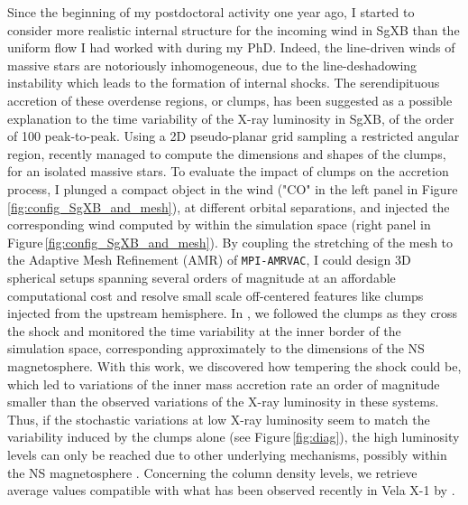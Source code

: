 \documentclass[a4paper,12pt,onecolumn]{article}
\makeatletter
\newcommand{\sgx}{SgXB\xspace}
\newcommand*{\ns}{NS\@\xspace}
\newcommand*{\eg}{e.g.\@\xspace}
\makeatother
\begin{document}
\indent Since the beginning of my postdoctoral activity one year ago, I started to consider more realistic internal structure for the incoming wind in \sgx than the uniform flow I had worked with during my PhD. Indeed, the line-driven winds of massive stars are notoriously inhomogeneous, due to the line-deshadowing instability \citep{Owocki1984a} which leads to the formation of internal shocks. The serendipituous accretion of these overdense regions, or clumps, has been suggested as a possible explanation to the time variability of the X-ray luminosity in \sgx, of the order of 100 peak-to-peak. Using a 2D pseudo-planar grid sampling a restricted angular region, \cite{Sundqvist2017} recently managed to compute the dimensions and shapes of the clumps, for an isolated massive stars. To evaluate the impact of clumps on the accretion process, I plunged a compact object in the wind ("CO" in the left panel in Figure\,\ref{fig:config_SgXB_and_mesh}), at different orbital separations, and injected the corresponding wind computed by \cite{Sundqvist2017} within the simulation space (right panel in Figure\,\ref{fig:config_SgXB_and_mesh}). By coupling the stretching of the mesh to the Adaptive Mesh Refinement (AMR) of \texttt{MPI-AMRVAC}, I could design 3D spherical setups spanning several orders of magnitude at an affordable computational cost and resolve small scale off-centered features like clumps injected from the upstream hemisphere. In \cite{ElMellah}, we followed the clumps as they cross the shock and monitored the time variability at the inner border of the simulation space, corresponding approximately to the dimensions of the \ns magnetosphere. With this work, we discovered how tempering the shock could be, which led to variations of the inner mass accretion rate an order of magnitude smaller than the observed variations of the X-ray luminosity in these systems. Thus, if the stochastic variations at low X-ray luminosity seem to match the variability induced by the clumps alone (see Figure\,\ref{fig:diag}), the high luminosity levels can only be reached due to other underlying mechanisms, possibly within the \ns magnetosphere \citep[\eg the propeller effect,][]{Bozzo2016}. Concerning the column density levels, we retrieve average values compatible with what has been observed recently in Vela X-1 by \cite{Grinberg2017}.
\end{document}
